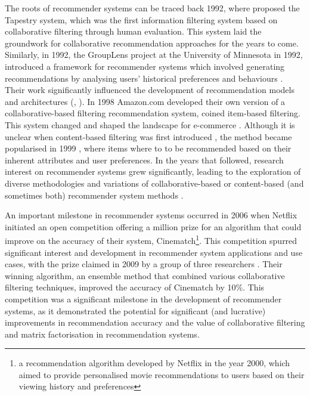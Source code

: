 The roots of recommender systems can be traced back 1992, where \cite{goldberg1992using} proposed the Tapestry system, which was the first information filtering system based on collaborative filtering through human evaluation. This system laid the groundwork for collaborative recommendation approaches for the years to come. Similarly, in 1992, the GroupLens project at the University of Minnesota in 1992, introduced a framework for recommender systems which involved generating recommendations by analysing users' historical preferences and behaviours \cite{konstan1997grouplens}. Their work significantly influenced the development of recommendation models and architectures (\cite{konstan1997grouplens}, \cite{huang2004applying}). In 1998 Amazon.com developed their own version of a collaborative-based filtering recommendation system, coined item-based filtering. This system changed and shaped the landscape for e-commerce \cite{linden2003amazon}. Although it is unclear when content-based filtering was first introduced \cite{balabanovic1997fab}, the method became popularised in 1999 \cite{herlocker1999algorithmic}, where items where to to be recommended based on their inherent attributes and user preferences. In the years that followed, research interest on recommender systems grew significantly, leading to the exploration of diverse methodologies and variations of collaborative-based or content-based (and sometimes both) recommender system methods \cite{burke2002hybrid}. 

An important milestone in recommender systems occurred in 2006 when Netflix initiated an open competition offering a  million prize for an algorithm that could improve on the accuracy of their system, Cinematch\footnote{a recommendation algorithm developed by Netflix in the year 2000, which aimed to provide personalised movie recommendations to users based on their viewing history and preferences}. This competition spurred significant interest and development in recommender system applications and use cases, with the prize claimed in 2009 by a group of three researchers \cite{bennett2007netflix}. Their winning algorithm, an ensemble method that combined various collaborative filtering techniques, improved the accuracy of Cinematch by 10\%. This competition was a significant milestone in the development of recommender systems, as it demonstrated the potential for significant (and lucrative) improvements in recommendation accuracy and the value of collaborative filtering and matrix factorisation in recommendation systems.

